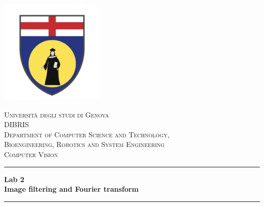 \begin{titlepage}

\newcommand{\HRule}{\rule{\linewidth}{0.5mm}} %

\begin{center}
    \includegraphics[width=5cm]{Title/Unige-logo.jpeg}\\[1cm] %
\end{center}


\begin{center}
    

    \textsc{\Huge Università degli studi di Genova}\\[1cm] %
    \textsc{\LARGE DIBRIS}\\[0.3cm]
    \textsc{\small Department of Computer Science and Technology,}\\
    \textsc{\small Bioengineering, Robotics and System Engineering}\\[1cm] %
    \textsc{\LARGE{Computer Vision}}\\[1cm] %

    \HRule\vspace{0.4cm}
    { \huge \bfseries Lab 2}\\[0.2cm] 
    {\Large \bfseries Image filtering and Fourier transform}\\
    \HRule\vspace{1.5cm}   


\end{center}
\end{titlepage}
